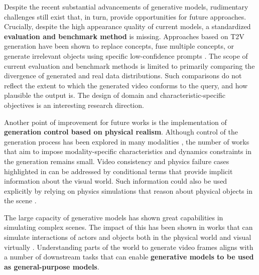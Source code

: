 Despite the recent substantial advancements of generative models, rudimentary challenges still exist that, in turn, provide opportunities for future approaches. Crucially, despite the high appearance quality of current models, a standardized \textbf{evaluation and benchmark method} is missing. Approaches based on T2V generation have been shown to replace concepts, fuse multiple concepts, or generate irrelevant objects using specific low-confidence prompts \citep{du2023stable}. The scope of current evaluation and benchmark methods \citep{huang2024vbench,liu2024evalcrafter,liu2023fetv,saito2020train,unterthiner2019fvd} is limited to primarily comparing the divergence of generated and real data distributions. Such comparisons do not reflect the extent to which the generated video conforms to the query, and how plausible the output is. The design of domain and characteristic-specific objectives is an interesting research direction. 

Another point of improvement for future works is the implementation of \textbf{generation control based on physical realism}. Although control of the generation process has been explored in many modalities \citep{zhang2023adding}, the number of works that aim to impose modality-specific characteristics and dynamics constraints in the generation remains small. Video consistency and physics failure cases highlighted in  can be addressed by conditional terms that provide implicit information about the visual world. Such information could also be used explicitly by relying on physics simulations that reason about physical objects in the scene \citep{liu2024physgen}.

The large capacity of generative models has shown great capabilities in simulating complex scenes. The impact of this has been shown in works that can simulate interactions of actors and objects both in the physical world \citep{yang2023learning} and visual virtually \citep{alonso2024diffusion,valevski2024diffusion}. Understanding parts of the world to generate video frames aligns with a number of downstream tasks that can enable \textbf{generative models to be used as general-purpose models}. 